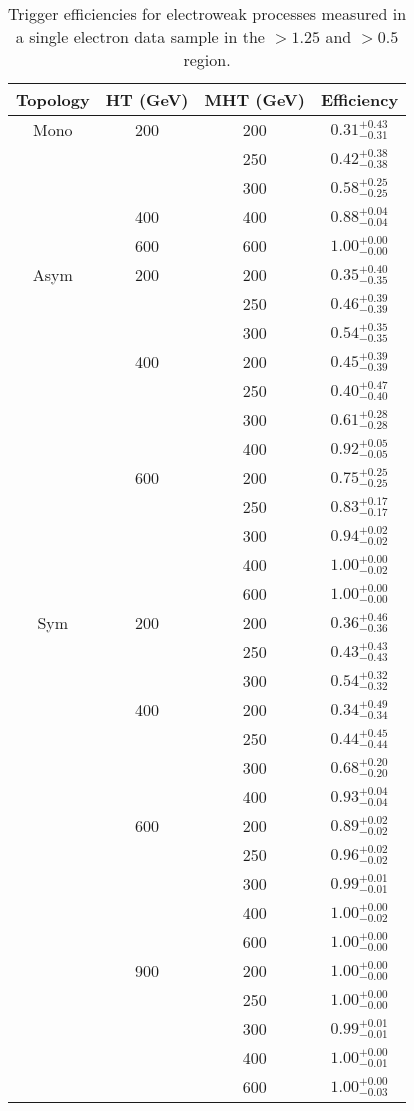 \begin{table}
\tiny
\centering
\caption{Trigger efficiencies for electroweak processes measured in a single electron
data sample in the \mhtmet$>1.25$ and \bdphi$>0.5$ region.}
\begin{tabular}{cccc}
\hline \hline
Topology & HT (GeV) & MHT (GeV) & Efficiency \\
\hline
\hline
Mono & 200 & 200 & $0.31^{+0.43}_{-0.31}$ \\
 &  & 250 & $0.42^{+0.38}_{-0.38}$ \\
 &  & 300 & $0.58^{+0.25}_{-0.25}$ \\
\hline
 & 400 & 400 & $0.88^{+0.04}_{-0.04}$ \\
\hline
 & 600 & 600 & $1.00^{+0.00}_{-0.00}$ \\
\hline
\hline
Asym & 200 & 200 & $0.35^{+0.40}_{-0.35}$ \\
 &  & 250 & $0.46^{+0.39}_{-0.39}$ \\
 &  & 300 & $0.54^{+0.35}_{-0.35}$ \\
\hline
 & 400 & 200 & $0.45^{+0.39}_{-0.39}$ \\
 &  & 250 & $0.40^{+0.47}_{-0.40}$ \\
 &  & 300 & $0.61^{+0.28}_{-0.28}$ \\
 &  & 400 & $0.92^{+0.05}_{-0.05}$ \\
\hline
 & 600 & 200 & $0.75^{+0.25}_{-0.25}$ \\
 &  & 250 & $0.83^{+0.17}_{-0.17}$ \\
 &  & 300 & $0.94^{+0.02}_{-0.02}$ \\
 &  & 400 & $1.00^{+0.00}_{-0.02}$ \\
 &  & 600 & $1.00^{+0.00}_{-0.00}$ \\
\hline
\hline
Sym & 200 & 200 & $0.36^{+0.46}_{-0.36}$ \\
 &  & 250 & $0.43^{+0.43}_{-0.43}$ \\
 &  & 300 & $0.54^{+0.32}_{-0.32}$ \\
\hline
 & 400 & 200 & $0.34^{+0.49}_{-0.34}$ \\
 &  & 250 & $0.44^{+0.45}_{-0.44}$ \\
 &  & 300 & $0.68^{+0.20}_{-0.20}$ \\
 &  & 400 & $0.93^{+0.04}_{-0.04}$ \\
\hline
 & 600 & 200 & $0.89^{+0.02}_{-0.02}$ \\
 &  & 250 & $0.96^{+0.02}_{-0.02}$ \\
 &  & 300 & $0.99^{+0.01}_{-0.01}$ \\
 &  & 400 & $1.00^{+0.00}_{-0.02}$ \\
 &  & 600 & $1.00^{+0.00}_{-0.00}$ \\
\hline
 & 900 & 200 & $1.00^{+0.00}_{-0.00}$ \\
 &  & 250 & $1.00^{+0.00}_{-0.00}$ \\
 &  & 300 & $0.99^{+0.01}_{-0.01}$ \\
 &  & 400 & $1.00^{+0.00}_{-0.01}$ \\
 &  & 600 & $1.00^{+0.00}_{-0.03}$ \\

\hline
\hline
\end{tabular}
\end{table}

